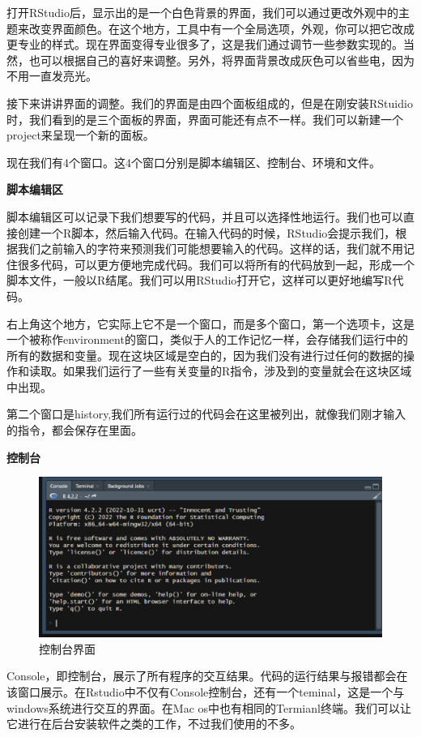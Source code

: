 \documentclass[
  oneside]{book}
\begin{document}
打开RStudio后，显示出的是一个白色背景的界面，我们可以通过更改外观中的主题来改变界面颜色。在这个地方，工具中有一个全局选项，外观，你可以把它改成更专业的样式。现在界面变得专业很多了，这是我们通过调节一些参数实现的。当然，也可以根据自己的喜好来调整。另外，将界面背景改成灰色可以省些电，因为不用一直发亮光。

接下来讲讲界面的调整。我们的界面是由四个面板组成的，但是在刚安装RStuidio时，我们看到的是三个面板的界面，界面可能还有点不一样。我们可以新建一个project来呈现一个新的面板。

现在我们有4个窗口。这4个窗口分别是脚本编辑区、控制台、环境和文件。

\textbf{脚本编辑区}

脚本编辑区可以记录下我们想要写的代码，并且可以选择性地运行。我们也可以直接创建一个R脚本，然后输入代码。在输入代码的时候，RStudio会提示我们，根据我们之前输入的字符来预测我们可能想要输入的代码。这样的话，我们就不用记住很多代码，可以更方便地完成代码。我们可以将所有的代码放到一起，形成一个脚本文件，一般以R结尾。我们可以用RStudio打开它，这样可以更好地编写R代码。

右上角这个地方，它实际上它不是一个窗口，而是多个窗口，第一个选项卡，这是一个被称作environment的窗口，类似于人的工作记忆一样，会存储我们运行中的所有的数据和变量。现在这块区域是空白的，因为我们没有进行过任何的数据的操作和读取。如果我们运行了一些有关变量的R指令，涉及到的变量就会在这块区域中出现。

第二个窗口是history,我们所有运行过的代码会在这里被列出，就像我们刚才输入的指令，都会保存在里面。

\textbf{控制台}

\begin{figure}
\centering
\includegraphics{1002-lesson2/image-20230309143318248.png}
\caption{控制台界面}
\end{figure}

Console，即控制台，展示了所有程序的交互结果。代码的运行结果与报错都会在该窗口展示。在Rstudio中不仅有Console控制台，还有一个teminal，这是一个与windows系统进行交互的界面。在Mac
os中也有相同的Termianl终端。我们可以让它进行在后台安装软件之类的工作，不过我们使用的不多。
\end{document}
